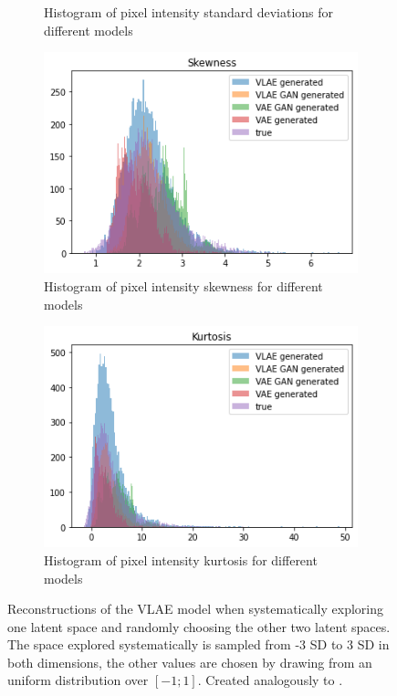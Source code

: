 \begin{figure}
\begin{subfigure}{0.48\textwidth}
        \caption{Histogram of pixel intensity standard deviations for different models}
        \label{subfig:sd_generated_vs_true}
    \end{subfigure}
    \hfill
    \begin{subfigure}{0.48\textwidth}
        \centering
        \includegraphics[width=\textwidth]{images/generated_vs_true/mnist_vs_models_skew.png}
        \caption{Histogram of pixel intensity skewness for different models}
        \label{subfig:skew_generated_vs_true}
    \end{subfigure}
    \hfill
    \begin{subfigure}{0.48\textwidth}
        \centering
        \includegraphics[width=\textwidth]{images/generated_vs_true/mnist_vs_models_kurt.png}
        \caption{Histogram of pixel intensity kurtosis for different models}
        \label{subfig:kurt_generated_vs_true}
    \end{subfigure}
    \caption{Reconstructions of the VLAE model when systematically exploring one latent space and randomly choosing the other two latent spaces. The space explored systematically is sampled from -3 SD to 3 SD in both dimensions, the other values are chosen by drawing from an uniform distribution over $[-1; 1]$. Created analogously to \citet[Figure 5]{zhao2017learning}.}
    \label{fig:mean_generated_vs_true}
\end{figure}


